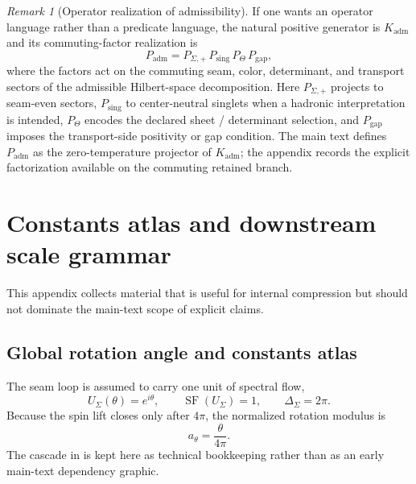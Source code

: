 \documentclass[11pt,a4paper]{article}
\theoremstyle{definition}
\theoremstyle{remark}
\newtheorem*{remark}{Remark}
\DeclareMathOperator{\SF}{SF}
\newcommand{\Seam}{\Sigma}
\newcommand{\atheta}{a_\theta}
\newcommand{\Kadm}{K_{\mathrm{adm}}}
\newcommand{\Padm}{P_{\mathrm{adm}}}
\begin{document}
\begin{remark}[Operator realization of admissibility]
If one wants an operator language rather than a predicate language, the natural positive generator is $\Kadm$ and its commuting-factor realization is
\[
P_{\mathrm{adm}}=P_{\Seam,+}\,P_{\mathrm{sing}}\,P_{\Theta}\,P_{\mathrm{gap}},
\]
where the factors act on the commuting seam, color, determinant, and transport sectors of the admissible Hilbert-space decomposition. Here $P_{\Seam,+}$ projects to seam-even sectors, $P_{\mathrm{sing}}$ to center-neutral singlets when a hadronic interpretation is intended, $P_{\Theta}$ encodes the declared sheet / determinant selection, and $P_{\mathrm{gap}}$ imposes the transport-side positivity or gap condition. The main text defines $\Padm$ as the zero-temperature projector of $\Kadm$; the appendix records the explicit factorization available on the commuting retained branch.
\end{remark}

\section{Constants atlas and downstream scale grammar}
\label{app:constants}

This appendix collects material that is useful for internal compression but should not dominate the main-text scope of explicit claims.

\subsection{Global rotation angle and constants atlas}

The seam loop is assumed to carry one unit of spectral flow,
\[
U_{\Seam}(\theta)=e^{i\theta},
\qquad
\SF(U_{\Seam})=1,
\qquad
\Delta_{\Seam}=2\pi.
\]
Because the spin lift closes only after $4\pi$, the normalized rotation modulus is
\[
\atheta=\frac{\theta}{4\pi}.
\]
The cascade in  is kept here as technical bookkeeping rather than as an early main-text dependency graphic.
\end{document}
